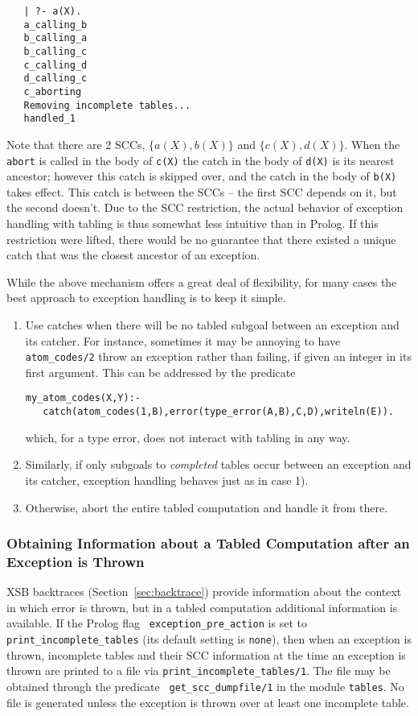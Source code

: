 \begin{small}
\begin{verbatim}
   | ?- a(X).
   a_calling_b
   b_calling_a
   b_calling_c
   c_calling_d
   d_calling_c
   c_aborting
   Removing incomplete tables...
   handled_1
\end{verbatim}
\end{small}
%
Note that there are 2 SCCs, $\{a(X),b(X)\}$ and $\{c(X),d(X)\}$.  When
the {\tt abort} is called in the body of {\tt c(X)} the catch in the
body of {\tt d(X)} is its nearest ancestor; however this catch is
skipped over, and the catch in the body of {\tt b(X)} takes effect.
This catch is between the SCCs -- the first SCC depends on it, but the
second doesn't.
%
Due to the SCC restriction, the actual behavior of exception handling
with tabling is thus somewhat less intuitive than in Prolog.  If this
restriction were lifted, there would be no guarantee that there
existed a unique catch that was the closest ancestor of an exception.

While the above mechanism offers a great deal of flexibility, for many
cases the best approach to exception handling is to keep it simple.
%
\begin{enumerate}
\item Use catches when there will be no tabled subgoal between an
  exception and its catcher.  For instance, sometimes it may be
  annoying to have {\tt atom\_codes/2} throw an exception rather than
  failing, if given an integer in its first argument.  This can be
  addressed by the predicate
%
\begin{verbatim}
my_atom_codes(X,Y):- 
   catch(atom_codes(1,B),error(type_error(A,B),C,D),writeln(E)).
\end{verbatim}
%
which, for a type error, does not interact with tabling in any way.  
%
\item Similarly, if only subgoals to {\em completed} tables occur
  between an exception and its catcher, exception handling behaves
  just as in case 1).
%
\item Otherwise, abort the entire tabled computation and handle it
  from there.
\end{enumerate}
%

\subsubsection{Obtaining Information about a Tabled Computation after an Exception is Thrown}
%
XSB backtraces (Section~\ref{sec:backtrace}) provide information about
the context in which error is thrown, but in a tabled computation
additional information is available.  If the Prolog flag {\tt
  exception\_pre\_action} is set to {\tt print\_incomplete\_tables}
(its default setting is {\tt none}), then when an exception is thrown,
incomplete tables and their SCC information at the time an exception
is thrown are printed to a file via {\tt print\_incomplete\_tables/1}.
The file may be obtained through the predicate {\tt
  get\_scc\_dumpfile/1} in the module {\tt tables}.  No file is
generated unless the exception is thrown over at least one incomplete
table.

